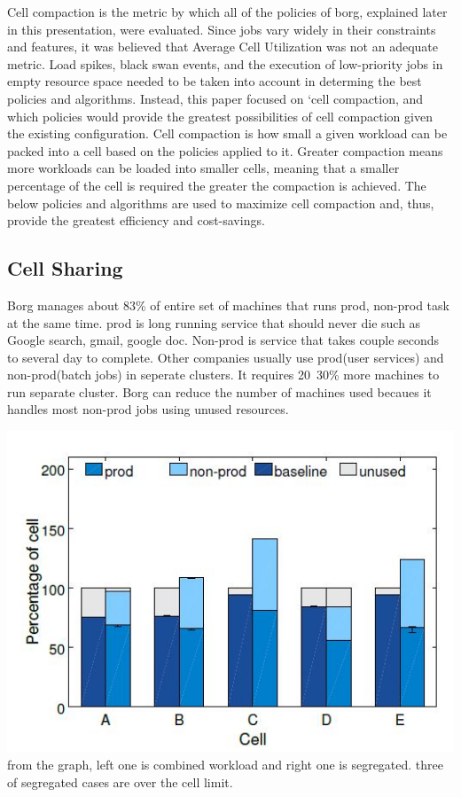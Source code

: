 \documentclass[runningheads,a4paper]{llncs}
\begin{document}
Cell compaction is the metric by which all of the policies of borg, explained later in this presentation, were evaluated.  Since jobs vary widely in their constraints and features, it was believed that Average Cell Utilization was not an adequate metric.  Load spikes, black swan events, and the execution of low-priority jobs in empty resource space needed to be taken into account in determing the best policies and algorithms.  Instead, this paper focused on ‘cell compaction, and which policies would provide the greatest possibilities of cell compaction given the existing configuration.  Cell compaction is how small a given workload can be packed into a cell based on the policies applied to it.  Greater compaction means more workloads can be loaded into smaller cells, meaning that a smaller percentage of the cell is required the greater the compaction is achieved.  The below policies and algorithms are used to maximize cell compaction and, thus, provide the greatest efficiency and cost-savings.


\subsection{Cell Sharing}

Borg manages about 83\% of entire set of machines that runs prod, non-prod task at the same time. prod is long running service that should never die such as Google search, gmail, google doc.
Non-prod is service that takes couple seconds to several day to complete. Other companies usually use prod(user services) and non-prod(batch jobs) in seperate clusters. 
It requires 20~30\% more machines to run separate cluster.
Borg can reduce the number of machines used becaues it handles most non-prod jobs using unused resources.


\includegraphics[scale=0.8]{segregation}
from the graph, left one is combined workload and right one is segregated. three of segregated cases are over the cell limit.
\end{document}
